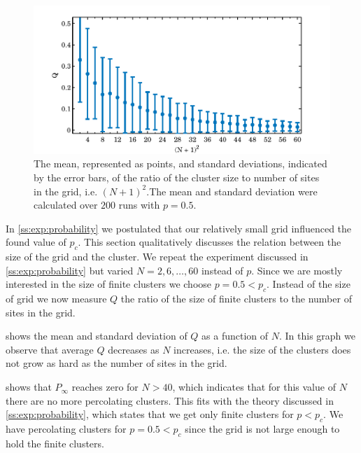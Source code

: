 \begin{figure}
	\centering
	\includegraphics[width=\textwidth]{./img/assignment_b_mean_std_n.pdf}
	\caption{The mean, represented as points, and standard deviations, indicated by the error bars, of the ratio of the cluster size to number of sites in the grid, i.e. $(N + 1)^2$.The mean and standard deviation were calculated over $200$ runs with $p = 0.5$.}
	\label{fig:experiment:size:mean_std_clusters}
\end{figure}

In \cref{ss:exp:probability} we postulated that our relatively small grid influenced the found value of $p_c$. This section qualitatively discusses the relation between the size of the grid and the cluster. We repeat the experiment discussed in \cref{ss:exp:probability} but varied $N = 2, 6, \dotsc, 60$ instead of $p$. Since we are mostly interested in the size of finite clusters we choose $p = 0.5 < p_c$. Instead of the size of grid we now measure $Q$ the ratio of the size of finite clusters to the number of sites in the grid. 

 shows the mean and standard deviation of $Q$ as a function of $N$. In this graph we observe that average $Q$ decreases as $N$ increases, i.e. the size of the clusters does not grow as hard as the number of sites in the grid.  

 shows that $P_\infty$ reaches zero for $N > 40$, which indicates that for this value of $N$ there are no more percolating clusters. This fits with the theory discussed in \cref{ss:exp:probability}, which states that we get only finite clusters for $p < p_c$. We have percolating clusters for $p = 0.5 < p_c$ since the grid is not large enough to hold the finite clusters.\\ 

